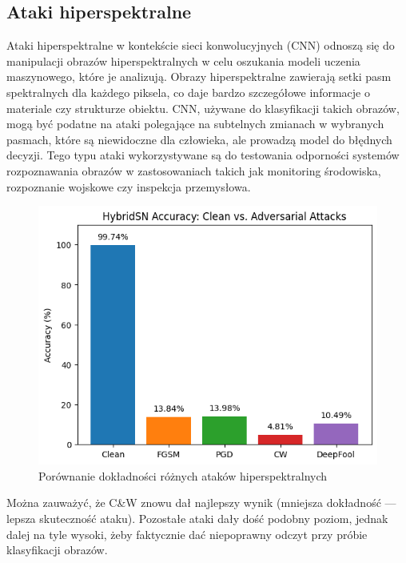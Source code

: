 \documentclass[12pt]{article}
\begin{document}
\subsection{Ataki hiperspektralne}

Ataki hiperspektralne w kontekście sieci konwolucyjnych (CNN) odnoszą się do manipulacji obrazów hiperspektralnych w celu oszukania modeli uczenia maszynowego, które je analizują. Obrazy hiperspektralne zawierają setki pasm spektralnych dla każdego piksela, co daje bardzo szczegółowe informacje o materiale czy strukturze obiektu. CNN, używane do klasyfikacji takich obrazów, mogą być podatne na ataki polegające na subtelnych zmianach w wybranych pasmach, które są niewidoczne dla człowieka, ale prowadzą model do błędnych decyzji. Tego typu ataki wykorzystywane są do testowania odporności systemów rozpoznawania obrazów w zastosowaniach takich jak monitoring środowiska, rozpoznanie wojskowe czy inspekcja przemysłowa.

\begin{figure}[H]
    \centering
    \includegraphics[width=1\textwidth]{hybridsn_accuracy.png} 
    \caption{Porównanie dokładności różnych ataków hiperspektralnych}
\end{figure}

Można zauważyć, że C\&W znowu dał najlepszy wynik (mniejsza dokładność — lepsza skuteczność ataku). Pozostałe ataki dały dość podobny poziom, jednak dalej na tyle wysoki, żeby faktycznie dać niepoprawny odczyt przy próbie klasyfikacji obrazów.
\end{document}
